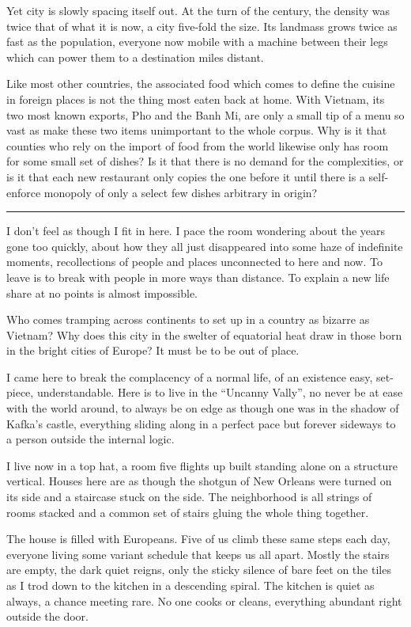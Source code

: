 \documentclass[ebook, 10pt, openright, onecolumn]{memoir}
\newcommand*\td[1]{
  \todo[inline]{
     #1 
  }
}
\newcommand*\starbreak{\fancybreak*{\Large{* * *}}}
\newcommand*\finish{\td{ ----- Finish this section -----}}
\begin{document}
Yet city is slowly spacing itself out.  At the turn of the century, the density
was twice that of what it is now, a city five-fold the size.  Its landmass grows
twice as fast as the population, everyone now mobile with a machine between
their legs which can power them to a destination miles distant.

\finish{}

Like most other countries, the associated food which comes to define the cuisine
in foreign places is not the thing most eaten back at home. With Vietnam, its
two most known exports, Pho and the Banh Mi, are only a small tip of a menu so
vast as make these two items unimportant to the whole corpus.  Why is it that
counties who rely on the import of food from the world likewise only has room
for some small set of dishes?  Is it that there is no demand for the
complexities, or is it that each new restaurant only copies the one before it
until there is a self-enforce monopoly of only a select few dishes arbitrary in
origin?

\finish


\starbreak

I don't feel as though I fit in here. I pace the room wondering about the years
gone too quickly, about how they all just disappeared into some haze of
indefinite moments, recollections of people and places unconnected to here and
now.  To leave is to break with people in more ways than distance.  To explain a
new life share at no points is almost impossible.

Who comes tramping across continents to set up in a country as bizarre as
Vietnam?  Why does this city in the swelter of equatorial heat draw in those
born in the bright cities of Europe?  It must be to be out of place.

I came here to break the complacency of a normal life, of an existence easy,
set-piece, understandable.  Here is to live in the ``Uncanny Vally'', no never
be at ease with the world around, to always be on edge as though one was in the
shadow of Kafka's castle, everything sliding along in a perfect pace but forever
sideways to a person outside the internal logic.

I live now in a top hat, a room five flights up built standing alone on a
structure vertical.  Houses here are as though the shotgun of New Orleans were
turned on its side and a staircase stuck on the side.  The neighborhood is all
strings of rooms stacked and a common set of stairs gluing the whole thing
together.

The house is filled with Europeans.  Five of us climb these same steps each
day, everyone living some variant schedule that keeps us all apart.  Mostly the
stairs are empty, the dark quiet reigns, only the sticky silence of bare feet
on the tiles as I trod down to the kitchen in a descending spiral.  The kitchen
is quiet as always, a chance meeting rare.  No one cooks or cleans, everything
abundant right outside the door.
\end{document}
